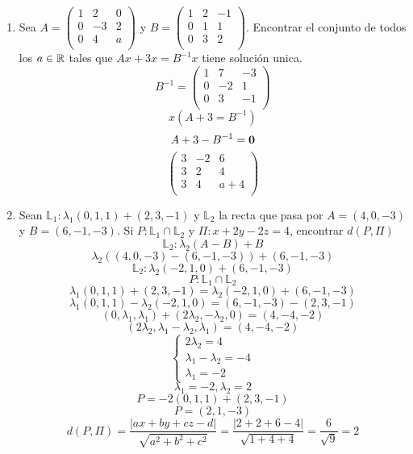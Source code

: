 \documentclass[../practica.root.tex]{subfiles}
\begin{document}
\begin{enumerate}
    \item Sea $A = \begin{pmatrix}
              1 & 2  & 0 \\
              0 & -3 & 2 \\
              0 & 4  & a \\
          \end{pmatrix}$ y $B = \begin{pmatrix}
              1 & 2 & -1 \\
              0 & 1 & 1  \\
              0 & 3 & 2  \\
          \end{pmatrix}$. Encontrar el conjunto de todos los $ a \in \mathbb{R} $ tales que $ Ax + 3x = B^{-1}x $ tiene solución unica.
          \[
              B^{-1} = \begin{pmatrix}
                  1 & 7  & -3 \\
                  0 & -2 & 1  \\
                  0 & 3  & -1 \\
              \end{pmatrix}
          \] \[
              x(A + 3 = B^{-1})
          \] \[
              A + 3 - B^{-1} = \mathbf{0}
          \] \[
              \begin{pmatrix}
                  3 & -2 & 6   \\
                  3 & 2  & 4   \\
                  3 & 4  & a+4 \\
              \end{pmatrix}
          \]

    \item Sean $\mathbb{L}_1 : \lambda_1(0,1,1)+(2,3,-1)$ y $\mathbb{L}_2$ la recta que pasa por $A = (4,0,-3)$ y $B = (6,-1,-3)$. Si $P : \mathbb{L}_1 \cap \mathbb{L}_2$ y $\Pi : x + 2y - 2z = 4$, encontrar $d(P,\Pi)$
          \[ \mathbb{L}_2 : \lambda_2(A-B) + B \]
          \[ \lambda_2((4,0,-3)-(6,-1,-3))+(6,-1,-3) \]
          \[ \mathbb{L}_2 : \lambda_2(-2,1,0)+(6,-1,-3) \]
          \[ P : \mathbb{L}_1 \cap \mathbb{L}_2 \]
          \[ \lambda_1(0,1,1)+(2,3,-1) = \lambda_2(-2,1,0)+(6,-1,-3) \]
          \[ \lambda_1(0,1,1)-\lambda_2(-2,1,0) = (6,-1,-3)-(2,3,-1) \]
          \[ (0,\lambda_1,\lambda_1)+(2\lambda_2,-\lambda_2,0) = (4,-4,-2) \]
          \[ (2\lambda_2,\lambda_1-\lambda_2,\lambda_1) = (4,-4,-2) \]
          \[
              \begin{cases}
                  2\lambda_2 = 4             \\
                  \lambda_1 - \lambda_2 = -4 \\
                  \lambda_1 = -2
              \end{cases}
          \] \[
              \lambda_1 = -2, \lambda_2 = 2
          \]
          \[ P = -2(0,1,1)+(2,3,-1) \]
          \[ P = (2,1,-3) \]
          \[
              d(P,\Pi) = \frac{
                  |ax + by + cz - d|
              }{
                  \sqrt{a^2 + b^2 + c^2}
              } = \frac{
                  |2 + 2 + 6 - 4|
              }{
                  \sqrt{1 + 4 + 4}
              } = \frac{6}{\sqrt{9}} = \boxed{2}
          \]



\end{enumerate}
\end{document}
